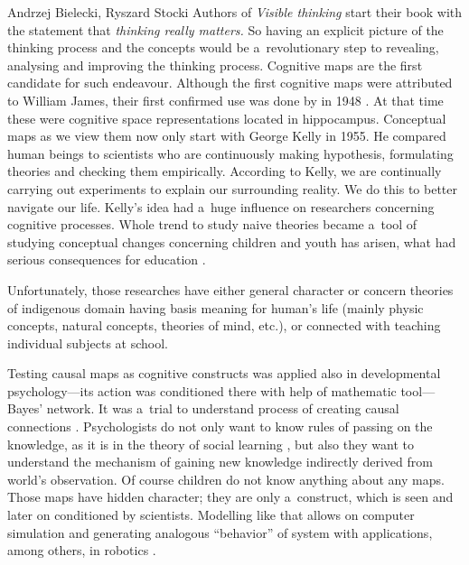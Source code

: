 \begin{artengenv2auth}{Andrzej Bielecki, Ryszard Stocki}
Authors of \textit{Visible thinking} 
\parencite[][]{brysson_visible_2004} %
 start their book with the statement that \textit{thinking really matters.} So having an explicit picture of the thinking process and the concepts would be a~revolutionary step to revealing, analysing and improving the thinking process. Cognitive maps are the first candidate for such endeavour. Although the first cognitive maps were attributed to William James, their first confirmed use was done by in 1948 
\parencite[][]{tolman_cognitive_1948}. %
 At that time these were cognitive space representations located in hippocampus. Conceptual maps as we view them now only start with George Kelly in 1955. He compared human beings to scientists who are continuously making hypothesis, formulating theories and checking them empirically. According to Kelly, we are continually carrying out experiments to explain our surrounding reality. We do this to better navigate our life. Kelly's idea had a~huge influence on researchers concerning cognitive processes. Whole trend to study naive theories became a~tool of studying conceptual changes concerning children and youth has arisen, what had serious consequences for education 
\parencites[][]{kuhn_children_1989}[][]{vosniadou_towards_1996}.%




Unfortunately, those researches have either general character 
\parencite[e.g.,][]{kruglansky_lay_1980} %
 or concern theories of indigenous domain having basis meaning for human's life (mainly physic concepts, natural concepts, theories of mind, etc.), or connected with teaching individual subjects at school.



Testing causal maps as cognitive constructs was applied also in developmental psychology---its action was conditioned there with help of mathematic tool---Bayes' network. It was a~trial to understand process of creating causal connections 
\parencite[][]{gopnik_theory_2004}. %
 Psychologists do not only want to know rules of passing on the knowledge, as it is in the theory of social learning 
\parencite[][]{bandura_social_1977}, %
 but also they want to understand the mechanism of gaining new knowledge indirectly derived from world's observation. Of course children do not know anything about any maps. Those maps have hidden character; they are only a~construct, which is seen and later on conditioned by scientists. Modelling like that allows on computer simulation and generating analogous ``behavior'' of system with applications, among others, in robotics 
\parencite[][]{chaib-draa_causal_2002}.%





\end{artengenv2auth}
